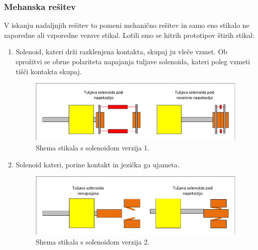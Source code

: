 \documentclass[a4paper,twoside,openright,12pt,Slovene]{book}
\begin{document}
	\subsubsection{Mehanska rešitev} \label{Mehanska rešitev}    
    
    
    V iskanju nadaljnjih rešitev to pomeni mehanično rešitev in samo eno stikalo ne zaporedne ali vzporedne vezave stikal. Lotili smo se hitrih prototipov štirih stikal:
    \begin{enumerate}
   
        \item  Solenoid, kateri drži razklenjena kontakta, skupaj ju vleče vzmet. Ob sprožitvi se obrne polariteta napajanja tuljave solenoida, kateri poleg vzmeti tišči kontakta skupaj.
    \begin{figure}[H]
        \centering
        \includegraphics[width=1\columnwidth]{Sheme/StikaloSolenoidVerzija1.pdf}
        \caption{\label{/StikaloSolenoidVerzija1} Shema stikala s solenoidom verzija 1.}
    \end{figure}
    
    \item  Solenoid kateri, porine kontakt in jezička ga ujameta.
    \begin{figure}[H]
        \centering
        \includegraphics[width=1\columnwidth]{Sheme/StikaloSolenoidVerzija2.pdf}
        \caption{\label{/StikaloSolenoidVerzija2} Shema stikala s solenoidom verzija 2.}
    \end{figure}
    

\end{enumerate}
\end{document}
